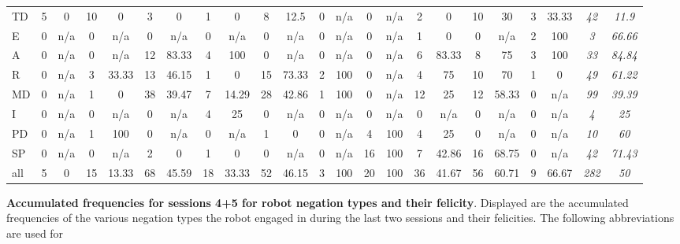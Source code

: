 \begin{screenonly}
\begin{table*}[h]
{{\begin{small}
\begin{tabular*}{\hsize}{@{\extracolsep{\fill}}lcccccccccccccccccccccc}
          \cmidrule(lr){2-3}\cmidrule(lr){4-5}\cmidrule(lr){6-7}\cmidrule(lr){8-9}\cmidrule(lr){10-11}\cmidrule(lr){12-13}\cmidrule(lr){14-15}
          \cmidrule(lr){16-17}\cmidrule(lr){18-19}\cmidrule(lr){20-21}\cmidrule(lr){22-23}
          TD & 5 & 0 & 10 & 0 & 3 & 0 & 1 & 0 & 8 & 12.5 & 0 & n/a & 0 & n/a & 2 & 0 & 10 & 30 & 3 & 33.33 & \emph{42} & \emph{11.9}\\
          E & 0 & n/a & 0 & n/a & 0 & n/a & 0 & n/a & 0 & n/a & 0 & n/a & 0 & n/a & 1 & 0 & 0 & n/a & 2 & 100 & \emph{3} &\emph{66.66} \\
          A & 0 & n/a & 0 & n/a & 12 & 83.33 & 4 & 100 & 0 & n/a & 0 & n/a & 0 & n/a & 6 & 83.33 & 8 & 75 & 3 & 100 & \emph{33} & \emph{84.84}\\
          R & 0 & n/a & 3 & 33.33 & 13 & 46.15 & 1 & 0 & 15 & 73.33 & 2 & 100 & 0 & n/a & 4 & 75 & 10 & 70 & 1 & 0 & \emph{49} & \emph{61.22}\\
          MD & 0 & n/a & 1 & 0 & 38 & 39.47 & 7 & 14.29 & 28 & 42.86 & 1 & 100 & 0 & n/a & 12 & 25 & 12 & 58.33 & 0 & n/a & \emph{99} & \emph{39.39}\\
          I & 0 & n/a & 0 & n/a & 0 & n/a & 4 & 25 & 0 & n/a & 0 & n/a & 0 & n/a & 0 & n/a & 0 & n/a & 0 & n/a & \emph{4} & \emph{25} \\
          PD & 0 & n/a & 1 & 100 & 0 & n/a & 0 & n/a & 1 & 0 & 0 & n/a & 4 & 100 & 4 & 25 & 0 & n/a & 0 & n/a & \emph{10} & \emph{60}\\
          SP & 0 & n/a & 0 & n/a & 2 & 0 & 1 & 0 & 0 & n/a & 0 & n/a & 16 & 100 & 7 & 42.86 & 16 & 68.75 & 0 & n/a & \emph{42} & \emph{71.43} \\
          \midrule
          all & 5 & 0 & 15 & 13.33 & 68 & 45.59 & 18 & 33.33 & 52 & 46.15 & 3 & 100 & 20 & 100 & 36 & 41.67 & 56 & 60.71 & 9 & 66.67 & \emph{282} & \emph{50} \\
          \bottomrule
        \end{tabular*}
      \end{small}
    }
  }
  \JoinCoffins{}\AccuFelTableP[t,l]
  \TypesetCoffin\AccuFelTable
\end{table*}
\NewCoffin \AccuFelTableLast
\NewCoffin \AccuFelTableRLast
\NewCoffin \AccuFelTablePLast
\begin{table*}[h]
\setlength{\tabcolsep}{0.35ex}
  \caption{\textbf{Accumulated frequencies for sessions 4+5 for robot negation types and their felicity}. Displayed are the accumulated frequencies
    of the various negation types the robot engaged in during the last two sessions and their felicities. The following abbreviations are used for 
}
\end{table*}
\end{screenonly}

